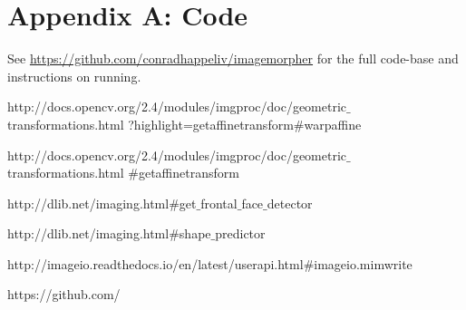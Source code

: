\documentclass[journal]{IEEEtran}
\begin{document}
\section{Appendix A: Code}
See \url{https://github.com/conradhappeliv/imagemorpher} for the full code-base and instructions on running.














%
%
%
\begin{thebibliography}{1}

\bibitem{}
http://docs.opencv.org/2.4/modules/imgproc/doc/geometric$\_$transformations.html
?highlight=getaffinetransform$\#$warpaffine

\bibitem{}
http://docs.opencv.org/2.4/modules/imgproc/doc/geometric$\_$transformations.html
$\#$getaffinetransform

\bibitem{}
http://dlib.net/imaging.html$\#$get$\_$frontal$\_$face$\_$detector

\bibitem{}
http://dlib.net/imaging.html$\#$shape$\_$predictor

\bibitem{}
http://imageio.readthedocs.io/en/latest/userapi.html$\#$imageio.mimwrite

\bibitem{}
https://github.com/

\end{thebibliography}
\end{document}
